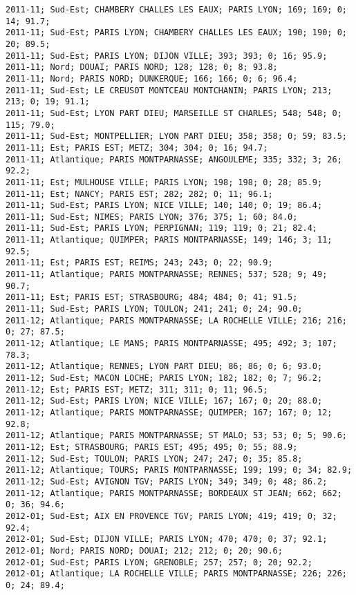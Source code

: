 \documentclass{article}
\begin{document}
\begin{Verbatim}[commandchars=\\\{\}]
2011-11; Sud-Est; CHAMBERY CHALLES LES EAUX; PARIS LYON; 169; 169; 0; 14; 91.7; 
2011-11; Sud-Est; PARIS LYON; CHAMBERY CHALLES LES EAUX; 190; 190; 0; 20; 89.5; 
2011-11; Sud-Est; PARIS LYON; DIJON VILLE; 393; 393; 0; 16; 95.9; 
2011-11; Nord; DOUAI; PARIS NORD; 128; 128; 0; 8; 93.8; 
2011-11; Nord; PARIS NORD; DUNKERQUE; 166; 166; 0; 6; 96.4; 
2011-11; Sud-Est; LE CREUSOT MONTCEAU MONTCHANIN; PARIS LYON; 213; 213; 0; 19; 91.1; 
2011-11; Sud-Est; LYON PART DIEU; MARSEILLE ST CHARLES; 548; 548; 0; 115; 79.0; 
2011-11; Sud-Est; MONTPELLIER; LYON PART DIEU; 358; 358; 0; 59; 83.5; 
2011-11; Est; PARIS EST; METZ; 304; 304; 0; 16; 94.7; 
2011-11; Atlantique; PARIS MONTPARNASSE; ANGOULEME; 335; 332; 3; 26; 92.2; 
2011-11; Est; MULHOUSE VILLE; PARIS LYON; 198; 198; 0; 28; 85.9; 
2011-11; Est; NANCY; PARIS EST; 282; 282; 0; 11; 96.1; 
2011-11; Sud-Est; PARIS LYON; NICE VILLE; 140; 140; 0; 19; 86.4; 
2011-11; Sud-Est; NIMES; PARIS LYON; 376; 375; 1; 60; 84.0; 
2011-11; Sud-Est; PARIS LYON; PERPIGNAN; 119; 119; 0; 21; 82.4; 
2011-11; Atlantique; QUIMPER; PARIS MONTPARNASSE; 149; 146; 3; 11; 92.5; 
2011-11; Est; PARIS EST; REIMS; 243; 243; 0; 22; 90.9; 
2011-11; Atlantique; PARIS MONTPARNASSE; RENNES; 537; 528; 9; 49; 90.7; 
2011-11; Est; PARIS EST; STRASBOURG; 484; 484; 0; 41; 91.5; 
2011-11; Sud-Est; PARIS LYON; TOULON; 241; 241; 0; 24; 90.0; 
2011-12; Atlantique; PARIS MONTPARNASSE; LA ROCHELLE VILLE; 216; 216; 0; 27; 87.5; 
2011-12; Atlantique; LE MANS; PARIS MONTPARNASSE; 495; 492; 3; 107; 78.3; 
2011-12; Atlantique; RENNES; LYON PART DIEU; 86; 86; 0; 6; 93.0; 
2011-12; Sud-Est; MACON LOCHE; PARIS LYON; 182; 182; 0; 7; 96.2; 
2011-12; Est; PARIS EST; METZ; 311; 311; 0; 11; 96.5; 
2011-12; Sud-Est; PARIS LYON; NICE VILLE; 167; 167; 0; 20; 88.0; 
2011-12; Atlantique; PARIS MONTPARNASSE; QUIMPER; 167; 167; 0; 12; 92.8; 
2011-12; Atlantique; PARIS MONTPARNASSE; ST MALO; 53; 53; 0; 5; 90.6; 
2011-12; Est; STRASBOURG; PARIS EST; 495; 495; 0; 55; 88.9; 
2011-12; Sud-Est; TOULON; PARIS LYON; 247; 247; 0; 35; 85.8; 
2011-12; Atlantique; TOURS; PARIS MONTPARNASSE; 199; 199; 0; 34; 82.9; 
2011-12; Sud-Est; AVIGNON TGV; PARIS LYON; 349; 349; 0; 48; 86.2; 
2011-12; Atlantique; PARIS MONTPARNASSE; BORDEAUX ST JEAN; 662; 662; 0; 36; 94.6; 
2012-01; Sud-Est; AIX EN PROVENCE TGV; PARIS LYON; 419; 419; 0; 32; 92.4; 
2012-01; Sud-Est; DIJON VILLE; PARIS LYON; 470; 470; 0; 37; 92.1; 
2012-01; Nord; PARIS NORD; DOUAI; 212; 212; 0; 20; 90.6; 
2012-01; Sud-Est; PARIS LYON; GRENOBLE; 257; 257; 0; 20; 92.2; 
2012-01; Atlantique; LA ROCHELLE VILLE; PARIS MONTPARNASSE; 226; 226; 0; 24; 89.4; 

\end{Verbatim}
\end{document}

